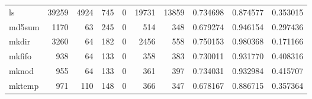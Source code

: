 \begin{tabular}{lrrrrrrrrr}
ls        &                               39259 &                                            4924 &                                            745 &                                             0 &                                          19731 &                                        13859 &                                           0.734698 &                               0.874577 &                             0.353015 \\
md5sum    &                                1170 &                                              63 &                                            245 &                                             0 &                                            514 &                                          348 &                                           0.679274 &                               0.946154 &                             0.297436 \\
mkdir     &                                3260 &                                              64 &                                            182 &                                             0 &                                           2456 &                                          558 &                                           0.750153 &                               0.980368 &                             0.171166 \\
mkfifo    &                                 938 &                                              64 &                                            133 &                                             0 &                                            358 &                                          383 &                                           0.730011 &                               0.931770 &                             0.408316 \\
mknod     &                                 955 &                                              64 &                                            133 &                                             0 &                                            361 &                                          397 &                                           0.734031 &                               0.932984 &                             0.415707 \\
mktemp    &                                 971 &                                             110 &                                            148 &                                             0 &                                            366 &                                          347 &                                           0.678167 &                               0.886715 &                             0.357364 \\

\end{tabular}
